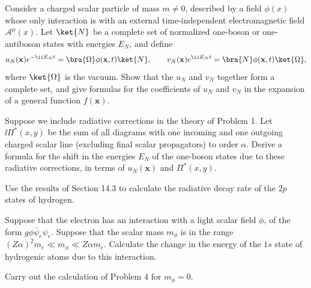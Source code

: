 
\begin{enumerate}
 Consider a charged scalar particle of mass $m\ne0$, described by a
field $\phi(x)$ whose only interaction is with an external time-independent
electromagnetic field $\mathcal{A}^{\mu}(x)$. Let $\ket{N}$ be a complete set
of normalized one-boson or one-antiboson states with energies $E_N$, and
define
\[
 u_N(\mathbf{x})e^{-\ii E_Nt}
   =\bra{\Omega}\phi(\mathbf{x},t)\ket{N},
 \qquad
 v_N(\mathbf{x})e^{\ii E_Nt}
   =\bra{N}\phi(\mathbf{x},t)\ket{\Omega},
\]
where $\ket{\Omega}$ is the vacuum. Show that the $u_N$ and $v_N$ together
form a complete set, and give formulas for the coefficients of $u_N$ and
$v_N$ in the expansion of a general function $f(\mathbf{x})$.

 Suppose we include radiative corrections in the theory of Problem 1.
Let $\ii\Pi^*(x,y)$ be the sum of all diagrams with one incoming and one
outgoing charged scalar line (excluding final scalar propagators) to order
$\alpha$. Derive a formula for the shift in the energies $E_N$ of the
one-boson states due to these radiative corrections, in terms of
$u_N(\mathbf{x})$ and $\Pi^*(x,y)$.

 Use the results of Section 14.3 to calculate the radiative decay rate
of the $2p$ states of hydrogen.

 Suppose that the electron has an interaction with a light scalar field
$\phi$, of the form $g\phi\bar\psi_e\psi_e$. Suppose that the scalar mass
$m_\phi$ is in the range
$(Z\alpha)^2m_e\ll m_\phi\ll Z\alpha m_e$. Calculate the change in the
energy of the $1s$ state of hydrogenic atoms due to this interaction.

 Carry out the calculation of Problem 4 for $m_\phi=0$.
\end{enumerate}
